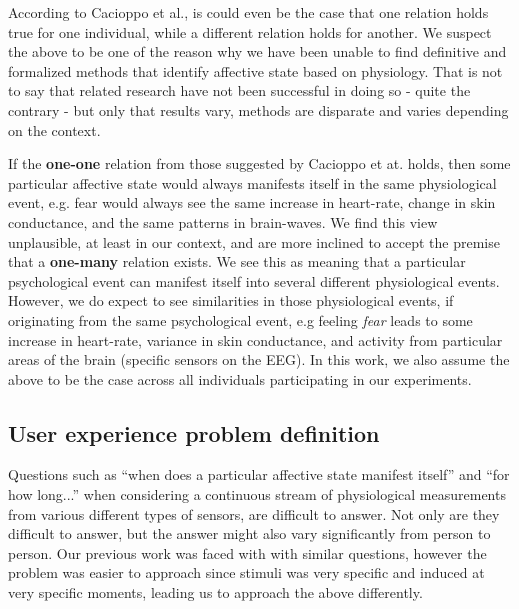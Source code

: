 According to Cacioppo et al., is could even be the case that one relation holds true for one individual, while a
different relation holds for another. We suspect the above to be one of the reason why we have been unable to find
definitive and formalized methods that identify affective state based on physiology. That is not to say that related
research have not been successful in doing so - quite the contrary - but only that results vary, methods are disparate
and varies depending on the context.

If the \textbf{one-one} relation from those suggested by Cacioppo et at. holds, then some particular affective state
would always manifests itself in the same physiological event, e.g. fear would always see the same increase in
heart-rate, change in skin conductance, and the same patterns in brain-waves. We find this view unplausible, at least in
our context, and are more inclined to accept the premise that a \textbf{one-many} relation exists. We see this as
meaning that a particular psychological event can manifest itself into several different physiological events. However,
we do expect to see similarities in those physiological events, if originating from the same psychological event, e.g
feeling \textit{fear} leads to some increase in heart-rate, variance in skin conductance, and activity from particular
areas of the brain (specific sensors on the EEG). In this work, we also assume the above to be the case across all
individuals participating in our experiments.

\subsection{User experience problem definition}
Questions such as ``when does a particular affective state manifest itself'' and ``for how long...'' when considering a
continuous stream of physiological measurements from various different types of sensors, are difficult to answer. Not
only are they difficult to answer, but the answer might also vary significantly from person to person. Our previous work
was faced with with similar questions, however the problem was easier to approach since stimuli was very specific and
induced at very specific moments, leading us to approach the above differently.

